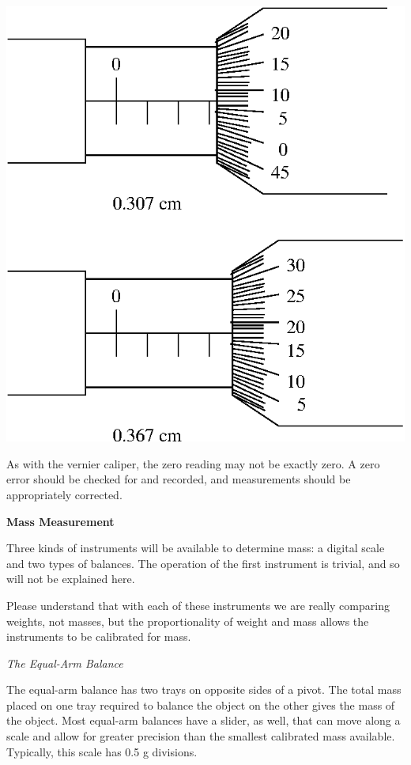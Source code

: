 \vspace{0.3cm}
{\centering \includegraphics{appendices/instrumentation/instrumentation_fig1.eps} \par}
\vspace{0.3cm}

As with the vernier caliper, the zero reading may not be exactly zero. A zero error should be checked for and recorded, and measurements should be appropriately corrected.

\textbf{Mass Measurement}

Three kinds of instruments will be available to determine mass: a digital scale and two types of balances. The operation of the first instrument is trivial, and so will not be explained here.

Please understand that with each of these instruments we are really comparing weights, not masses, but the proportionality of weight and mass allows the instruments to be calibrated for mass.

\textit{The Equal-Arm Balance}

The equal-arm balance has two trays on opposite sides of a pivot. The total mass placed on one tray required to balance the object on the other gives the mass of the object. Most equal-arm balances have a slider, as well, that can move along a scale and allow for greater precision than the smallest calibrated mass available. Typically, this scale has 0.5 g divisions.

